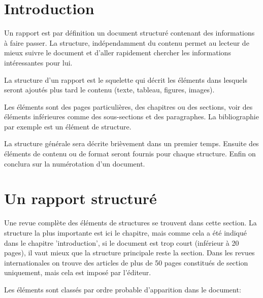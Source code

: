 
\section{Introduction}

Un rapport est par définition un document structuré contenant des informations à faire passer.
 La structure, indépendamment du contenu permet au lecteur 
de mieux suivre le document et d'aller rapidement  chercher les informations intéressantes pour lui.

La structure d'un rapport est le squelette qui décrit les éléments dans lesquels seront ajoutés
plus tard le contenu (texte, tableau, figures, images).

Les éléments sont des pages particulières, des chapitres ou des sections, voir des éléments inférieures comme des sous-sections et des paragraphes. 
La bibliographie par exemple est un élément de structure.

La structure générale sera décrite brièvement dans un premier temps.
Ensuite des éléments de contenu ou de format seront fournis pour chaque structure.
Enfin on conclura sur la numérotation d'un document.

\section{Un rapport structuré}

Une revue complète des éléments de structures se trouvent dans cette section.
La structure la plus importante est ici le chapitre, mais comme cela a été indiqué dans le chapitre 'introduction',
 si le document est trop court (inférieur à 20 pages), il vaut mieux que la structure principale reste la section.
 Dans les revues internationales on trouve  des articles de plus de 50 pages constitués de section uniquement, mais cela est imposé par l'éditeur.  

Les éléments sont classés par ordre probable d'apparition dans le document:

